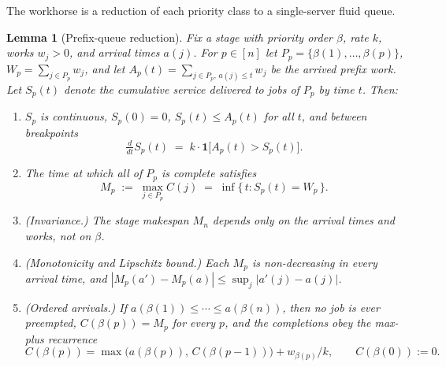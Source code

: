 \documentclass[sn-mathphys,NameDate]{sn-jnl}
\theoremstyle{thmstyleone}
\newtheorem{lemma}[theorem]{Lemma}
\theoremstyle{thmstylethree}
\theoremstyle{thmstyletwo}
\begin{document}
The workhorse is a reduction of each priority class to a
single-server fluid queue.

\begin{lemma}[Prefix-queue reduction]
\label{lem:prefix}
Fix a stage with priority order $\beta$, rate $k$, works
$w_j > 0$, and arrival times $a(j)$. For $p \in [n]$ let
$P_p = \{\beta(1), \ldots, \beta(p)\}$,
$W_p = \sum_{j \in P_p} w_j$, and let
$A_p(t) = \sum_{j \in P_p,\, a(j) \leq t} w_j$ be the arrived
prefix work. Let $S_p(t)$ denote the cumulative service
delivered to jobs of $P_p$ by time $t$. Then:
\begin{enumerate}
\item[\textup{(i)}] $S_p$ is continuous, $S_p(0) = 0$,
  $S_p(t) \leq A_p(t)$ for all $t$, and between breakpoints
  \[
    \tfrac{d}{dt} S_p(t) \;=\; k \cdot
    \mathbf{1}\bigl[A_p(t) > S_p(t)\bigr].
  \]
\item[\textup{(ii)}] The time at which all of $P_p$ is
  complete satisfies
  \[
    M_p \;:=\; \max_{j \in P_p} C(j)
    \;=\; \inf\{\, t : S_p(t) = W_p \,\}.
  \]
\item[\textup{(iii)}] \textup{(Invariance.)} The stage
  makespan $M_n$ depends only on the arrival times and works,
  not on $\beta$.
\item[\textup{(iv)}] \textup{(Monotonicity and Lipschitz
  bound.)} Each $M_p$ is non-decreasing in every arrival time,
  and $|M_p(a') - M_p(a)| \leq \sup_j |a'(j) - a(j)|$.
\item[\textup{(v)}] \textup{(Ordered arrivals.)} If
  $a(\beta(1)) \leq \cdots \leq a(\beta(n))$, then no job is
  ever preempted, $C(\beta(p)) = M_p$ for every $p$, and the
  completions obey the max-plus recurrence
  \[
    C(\beta(p)) = \max\bigl(a(\beta(p)),\,
      C(\beta(p-1))\bigr) + w_{\beta(p)}/k,
    \qquad C(\beta(0)) := 0 .
  \]
\end{enumerate}
\end{lemma}
\end{document}
